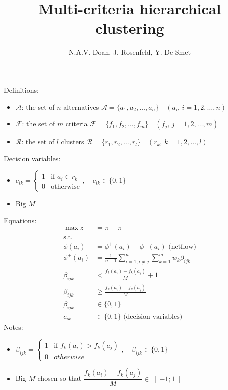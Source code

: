 \documentclass[a4paper]{journal}
\title{Multi-criteria hierarchical clustering}
\author{N.A.V. Doan, J. Rosenfeld, Y. De Smet}
\date{}
\begin{document}
    \maketitle
    Definitions:
    \begin{itemize}
        \item $\mathcal{A}$: the set of $n$ alternatives $\mathcal{A} = \{a_1, a_2, \dots, a_n\} \quad (a_i,\, i = 1, 2, \dots, n)$
        \item $\mathcal{F}$: the set of $m$ criteria $\mathcal{F} = \{f_1, f_2, \dots, f_m\} \quad (f_j,\, j = 1, 2, \dots, m)$
        \item $\mathcal{R}$: the set of $l$ clusters $\mathcal{R} = \{r_1, r_2, \dots, r_l\} \quad (r_k,\, k = 1, 2, \dots, l)$
    \end{itemize}
    Decision variables:
    \begin{itemize}
        \item $c_{ik} = \begin{cases}
            1 & \text{if } a_i \in r_k \\
            0 & \text{otherwise}
        \end{cases}, \quad c_{ik} \in \{0, 1\}$
        \item Big $M$
    \end{itemize}
    Equations:
    \begin{align*}
        \max z &= \pi_{} - \pi_{}\\
        \text{s.t.} & \\
        \phi(a_i) &= \phi^+(a_i) - \phi^-(a_i) \text{ (netflow)} \\
        \phi^+(a_i) &= \frac{1}{n-1} \sum_{i=1, i\neq j}^{n} \sum_{k=1}^{m} w_k \beta_{ijk} \\
        \beta_{ijk} &< \frac{f_k(a_i)-f_k(a_j)}{M} + 1 \\
        \beta_{ijk} &\geq \frac{f_k(a_i)-f_k(a_j)}{M} \\
        \beta_{ijk} &\in \{0,1\}\\
        c_{ik} &\in \{0, 1\} \text{ (decision variables)}
    \end{align*}
    Notes:
    \begin{itemize}
        \item $\beta_{ijk} = \begin{cases}
            1 & \text{if } f_k(a_i) > f_k(a_j) \\
            0 & otherwise
        \end{cases}, \quad \beta_{ijk} \in \{0, 1\}$
        \item Big $M$ chosen so that $\dfrac{f_k(a_i)-f_k(a_j)}{M} \in \left]-1;1\right[$
    \end{itemize}
\end{document}
